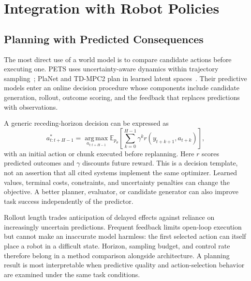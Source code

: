 \section{Integration with Robot Policies}
\label{sec:policy}

\subsection{Planning with Predicted Consequences}
The most direct use of a world model is to compare candidate actions before executing one. PETS uses uncertainty-aware dynamics within trajectory sampling~\cite{chua2018pets}; PlaNet and TD-MPC2 plan in learned latent spaces~\cite{hafner2019planet,hansen2024tdmpc2}. Their predictive models enter an online decision procedure whose components include candidate generation, rollout, outcome scoring, and the feedback that replaces predictions with observations.

A generic receding-horizon decision can be expressed as
\begin{equation}
 a^*_{t:t+H-1}=\operatorname*{arg\,max}_{a_{t:t+H-1}}
 \mathbb{E}_{p_\theta}\!\left[\sum_{k=0}^{H-1}\gamma^k r(y_{t+k+1},a_{t+k})\right],
 \label{eq:planning}
\end{equation}
with an initial action or chunk executed before replanning. Here $r$ scores predicted outcomes and $\gamma$ discounts future reward. This is a decision template, not an assertion that all cited systems implement the same optimizer. Learned values, terminal costs, constraints, and uncertainty penalties can change the objective. A better planner, evaluator, or candidate generator can also improve task success independently of the predictor.

Rollout length trades anticipation of delayed effects against reliance on increasingly uncertain predictions. Frequent feedback limits open-loop execution but cannot make an inaccurate model harmless: the first selected action can itself place a robot in a difficult state. Horizon, sampling budget, and control rate therefore belong in a method comparison alongside architecture. A planning result is most interpretable when predictive quality and action-selection behavior are examined under the same task conditions.

